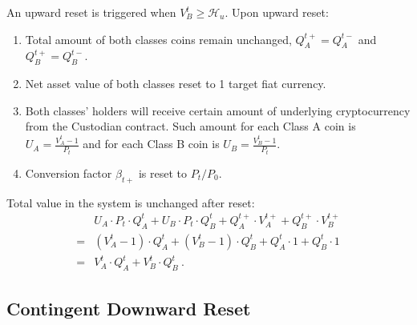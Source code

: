 \documentclass[draft, noinfoline]{ectaart}
\numberwithin{equation}{section}
\theoremstyle{plain}
\begin{document}
\begin{appendices}
An upward reset is triggered when $V_{B}^{t}\geqslant\mathcal{H}_{u}$. Upon upward reset:
\begin{enumerate}
\item Total amount of both classes coins remain unchanged, $Q_{A}^{t+}=Q_{A}^{t-}$ and $Q_{B}^{t+}=Q_{B}^{t-}$.
\item Net asset value of both classes reset to 1 target fiat currency.
\item Both classes' holders will receive certain amount of underlying cryptocurrency from the Custodian contract. Such amount for each Class A coin is $U_{A}=\frac{V_{A}^{t}-1}{P_{t}}$ and for each Class B coin is $U_{B}=\frac{V_{B}^{t}-1}{P_{t}}$.
\item Conversion factor $\beta_{t+}$ is reset to $P_t/P_0$.
\end{enumerate}
Total value in the system is unchanged after reset:
\begin{align*}
 & U_{A}\cdot P_{t}\cdot Q_{A}^{t}+U_{B}\cdot P_{t}\cdot Q_{B}^{t}+Q_{A}^{t+}\cdot V_{A}^{t+}+Q_{B}^{t+}\cdot V_{B}^{t+}\\
= & \left(V_{A}^{t}-1\right)\cdot Q_{A}^{t}+\left(V_{B}^{t}-1\right)\cdot Q_{B}^{t}+Q_{A}^{t}\cdot1+Q_{B}^{t}\cdot1\\
= & V_{A}^{t}\cdot Q_{A}^{t}+V_{B}^{t}\cdot Q_{B}^{t}\ .
\end{align*}

\subsection{Contingent Downward Reset\label{subsec:Contingent-Downward-Reset}}


\end{appendices}
\end{document}
